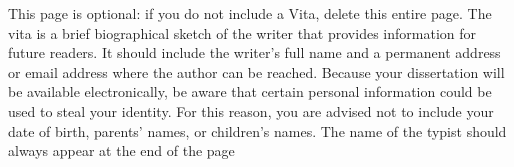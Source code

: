 \documentclass[12pt]{report}         %
\begin{document}

\begin{thesisauthorvita}    

This page is optional:  if you do not include a Vita, delete this entire page.  The vita is a brief biographical sketch of the writer that provides information for future readers.  It should include the writer's full name and a permanent address or email address where the author can be reached. Because your dissertation will be available electronically, be aware that certain personal information could be used to steal your identity. For this reason, you are advised not to include your date of birth, parents’ names, or children’s names. The name of the typist should always appear at the end of the page

\end{thesisauthorvita}               
\end{document}
